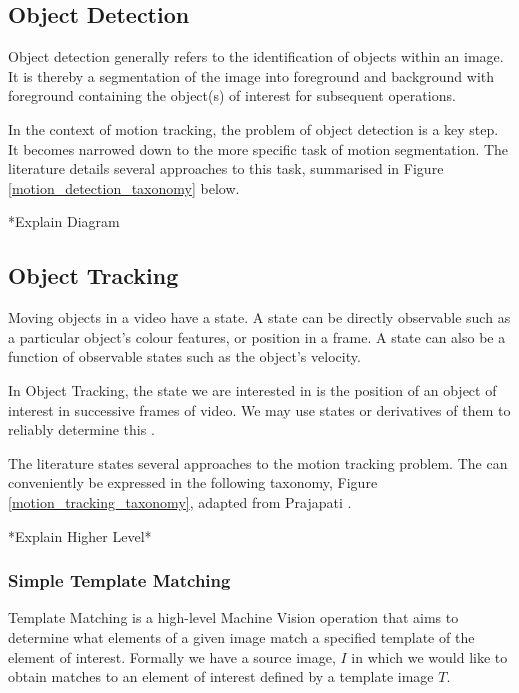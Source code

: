 \subsection{Object Detection}
Object detection generally refers to the identification of objects within
an image. It is thereby a segmentation of the image into foreground
and background with foreground containing the object(s) of interest for subsequent
operations.

In the context of motion tracking, the problem of object detection is a key
step. It becomes narrowed down to the more specific task of motion segmentation.
The literature details several approaches to this task, summarised in 
Figure \ref{motion_detection_taxonomy} below.


*Explain Diagram

\subsection{Object Tracking}
Moving objects in a video have a state. A state can be directly observable such as a
particular object's colour features, or position in a frame. A state can also be a function
of observable states such as the object's velocity.

In Object Tracking, the state we are interested in is the position of an object
of interest in successive frames of video. We may use states or derivatives of
them to reliably determine this \cite{Forsyth2012}.

The literature states several approaches to the motion tracking problem. The can
conveniently be expressed in the following taxonomy, Figure \ref{motion_tracking_taxonomy},
adapted from Prajapati \cite{Prajapati2015}.


*Explain Higher Level*

\subsubsection{Simple Template Matching}
Template Matching is a high-level Machine Vision operation that aims to determine
what elements of a given image match a specified template of the element of
interest.
Formally we have a source image, $I$ in which we would like to obtain matches to
an element of interest defined by a template image $T$.

